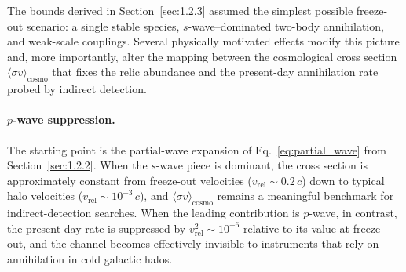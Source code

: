 The bounds derived in Section~\ref{sec:1.2.3} assumed the simplest possible freeze-out scenario: a single stable species, $s$-wave--dominated two-body annihilation, and weak-scale couplings.
Several physically motivated effects modify this picture and, more importantly, alter the mapping between the cosmological cross section $\langle\sigma v\rangle_\mathrm{cosmo}$ that fixes the relic abundance and the present-day annihilation rate probed by indirect detection.

\paragraph{$p$-wave suppression.}
The starting point is the partial-wave expansion of Eq.~\eqref{eq:partial_wave} from Section~\ref{sec:1.2.2}.
When the $s$-wave piece is dominant, the cross section is approximately constant from freeze-out velocities ($v_\mathrm{rel}\sim 0.2\,c$) down to typical halo velocities ($v_\mathrm{rel}\sim 10^{-3}\,c$), and $\langle\sigma v\rangle_\mathrm{cosmo}$ remains a meaningful benchmark for indirect-detection searches.
When the leading contribution is $p$-wave, in contrast, the present-day rate is suppressed by $v_\mathrm{rel}^2 \sim 10^{-6}$ relative to its value at freeze-out, and the channel becomes effectively invisible to instruments that rely on annihilation in cold galactic halos.

